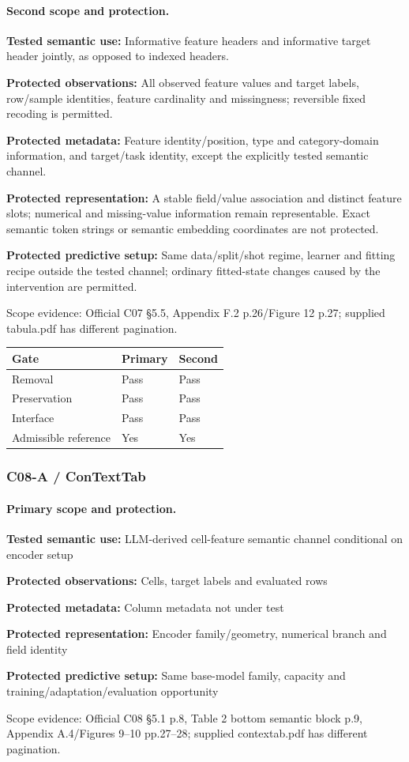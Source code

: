 \documentclass[10pt]{article}
\begin{document}
\paragraph{Second scope and protection.}
\textbf{Tested semantic use:} Informative feature headers and informative target header jointly, as opposed to indexed headers.\par
\textbf{Protected observations:} All observed feature values and target labels, row/sample identities, feature cardinality and missingness; reversible fixed recoding is permitted.\par
\textbf{Protected metadata:} Feature identity/position, type and category-domain information, and target/task identity, except the explicitly tested semantic channel.\par
\textbf{Protected representation:} A stable field/value association and distinct feature slots; numerical and missing-value information remain representable. Exact semantic token strings or semantic embedding coordinates are not protected.\par
\textbf{Protected predictive setup:} Same data/split/shot regime, learner and fitting recipe outside the tested channel; ordinary fitted-state changes caused by the intervention are permitted.\par
Scope evidence: Official C07 §5.5, Appendix F.2 p.26/Figure 12 p.27; supplied tabula.pdf has different pagination.\par
\begin{tabular}{lll}\toprule Gate & Primary & Second \\ \midrule
Removal & Pass & Pass \\
Preservation & Pass & Pass \\
Interface & Pass & Pass \\
Admissible reference & Yes & Yes \\
\bottomrule\end{tabular}
\subsubsection*{C08-A / ConTextTab}
\paragraph{Primary scope and protection.}
\textbf{Tested semantic use:} LLM-derived cell-feature semantic channel conditional on encoder setup\par
\textbf{Protected observations:} Cells, target labels and evaluated rows\par
\textbf{Protected metadata:} Column metadata not under test\par
\textbf{Protected representation:} Encoder family/geometry, numerical branch and field identity\par
\textbf{Protected predictive setup:} Same base-model family, capacity and training/adaptation/evaluation opportunity\par
Scope evidence: Official C08 §5.1 p.8, Table 2 bottom semantic block p.9, Appendix A.4/Figures 9--10 pp.27--28; supplied contextab.pdf has different pagination.\par
\end{document}
